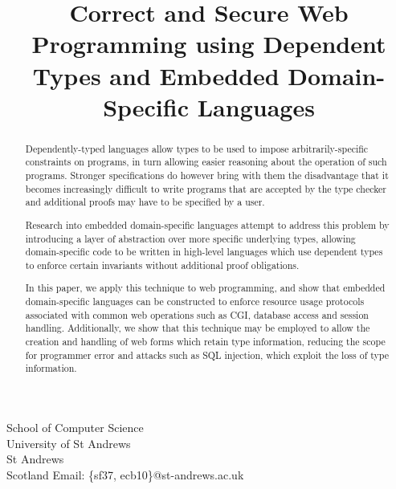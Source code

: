 \documentclass[preprint]{sigplanconf}
\begin{document}
\newcommand{\idris}{\textsc{Idris}}
\setlength{\pdfpageheight}{\paperheight}
\setlength{\pdfpagewidth}{\paperwidth}





\preprintfooter{}   %

\title{Correct and Secure Web Programming using Dependent Types and Embedded Domain-Specific Languages}

           {School of Computer Science \\ University of St Andrews \\ St Andrews \\ Scotland}
           {Email: \{sf37, ecb10\}@st-andrews.ac.uk}

\maketitle

\begin{abstract}
Dependently-typed languages allow types to be used to impose arbitrarily-specific constraints on programs, in turn allowing easier reasoning about the operation of such programs. Stronger specifications do however bring with them the disadvantage that it becomes increasingly difficult to write programs that are accepted by the type checker and additional proofs may have to be specified by a user.

Research into embedded domain-specific languages attempt to address this problem by introducing a layer of abstraction over more specific underlying types, allowing domain-specific code to be written in high-level languages which use dependent types to enforce certain invariants without additional proof obligations. 

In this paper, we apply this technique to web programming, and show that embedded domain-specific languages can be constructed to enforce resource usage protocols associated with common web operations such as CGI, database access and session handling. Additionally, we show that this technique may be employed to allow the creation and handling of web forms which retain type information, reducing the scope for programmer error and attacks such as SQL injection, which exploit the loss of type information.
\end{abstract}
\end{document}
